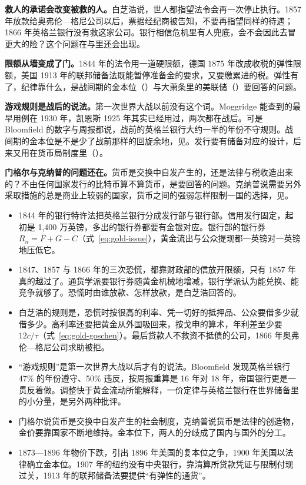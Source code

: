 \textbf{救人的承诺会改变被救的人。}白芝浩说，世人都指望法令会再一次停止执行\cite{bagehot1873}。1857 年放款给奥弗伦—格尼公司以后，票据经纪商被告知，不要再指望同样的待遇；1866 年英格兰银行没有救这家公司\cite{bagehot1873}。银行相信危机里有人兜底，会不会因此去冒更大的险？这个问题在与里还会出现。

\textbf{限额从墙变成了门。}1844 年的法令用一道硬限额，德国 1875 年改成收税的弹性限额，美国 1913 年的联邦储备法既能暂停准备金的要求，又要缴累进的税。弹性有了，纪律靠什么，是战间期的金本位（）与大萧条里的美联储（）要回答的问题。

\textbf{游戏规则是战后的说法。}第一次世界大战以前没有这个词\cite{dutton1984}。Moggridge 能查到的最早用例在 1930 年，凯恩斯 1925 年其实已经用过，两次都在战后\cite{dutton1984,keynes1925}。可是 Bloomfield 的数字与周报都说，战前的英格兰银行大约一半的年份不守规则。战间期的金本位是不是少了战前那样的回旋余地，见。发行要有储备对应的设计，后来又用在货币局制度里（）。

\textbf{门格尔与克纳普的问题还在。}货币是交换中自发产生的，还是法律与税收造出来的？不由任何国家发行的比特币算不算货币，是要回答的问题。克纳普说需要另外采取措施的总是商业上较弱的国家，货币之间的强弱怎样限制一国的选择，见。

\begin{takeaways}
\begin{itemize}
\item 1844 年的银行特许法把英格兰银行分成发行部与银行部。信用发行固定，起初是 1,400 万英镑，多出的银行券都要有金银对应。银行部的银行券 $R_n=\bar F+G-C$（式~\eqref{eq:gold-issue}），黄金流出与公众提现都一英镑对一英镑地压低它。
\item 1847、1857 与 1866 年的三次恐慌，都靠财政部的信放开限额，只有 1857 年真的越过了。通货学派要银行券随黄金机械地增减，银行学派认为能兑换、能竞争就够了。恐慌时由谁放款、怎样放款，是白芝浩回答的。
\item 白芝浩的规则是，恐慌时按很高的利率、凭一切好的抵押品、公众要借多少就借多少。高利率还要把黄金从外国吸回来，按戈申的算术，年利差至少要 $12c/\tau$（式~\eqref{eq:gold-goschen}）。最后贷款人不救资不抵债的公司，1866 年奥弗伦—格尼公司求助被拒。
\item “游戏规则”是第一次世界大战以后才有的说法。Bloomfield 发现英格兰银行 47\% 的年份遵守、50\% 违反，按周报重算是 16 年对 18 年，帝国银行更是一贯反着做。调整快于黄金流动所能解释，一价定律与英格兰银行在世界储备里的小分量，是另外两种批评。
\item 门格尔说货币是交换中自发产生的社会制度，克纳普说货币是法律的创造物，金价要靠国家不断地维持。金本位下，两人的分歧成了国内与国外的分工。
\item 1873—1896 年物价下跌，引出 1896 年美国的复本位之争，1900 年美国以法律确立金本位。1907 年的纽约没有中央银行，靠清算所贷款凭证与限制付现过关，1913 年的联邦储备法要提供“有弹性的通货”。
\end{itemize}
\end{takeaways}

